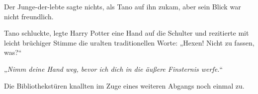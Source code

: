 Der Junge-der-lebte sagte nichts, als Tano auf ihn zukam, aber sein Blick war nicht freundlich.

Tano schluckte, legte Harry Potter eine Hand auf die Schulter und rezitierte mit leicht brüchiger Stimme die uralten traditionellen Worte: „Hexen! Nicht zu fassen, was?“

„\emph{Nimm deine Hand weg, bevor ich dich in die äußere Finsternis werfe.}“

Die Bibliothekstüren knallten im Zuge eines weiteren Abgangs noch einmal zu.

